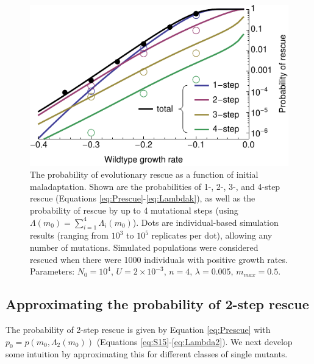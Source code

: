 \documentclass[9pt,twocolumn,twoside,lineno]{gsajnl}
\begin{document}
\begin{figure}[htb]
\centering
\includegraphics[width=\linewidth]{../IMAGES/4stepNormalU_sims.pdf}
\caption{
The probability of evolutionary rescue as a function of initial maladaptation.
Shown are the probabilities of 1-, 2-, 3-, and 4-step rescue (Equations \ref{eq:Prescue}-\ref{eq:Lambdak}), as well as the probability of rescue by up to 4 mutational steps (using $\Lambda(m_0) = \sum_{i=1}^4 \Lambda_i(m_0)$).
Dots are individual-based simulation results (ranging from $10^3$ to $10^5$ replicates per dot), allowing any number of mutations.
Simulated populations were considered rescued when there were 1000 individuals with positive growth rates.
Parameters: $N_0=10^4$, $U=2\times10^{-3}$, $n=4$, $\lambda=0.005$, $m_{max}=0.5$.
}%
\label{fig:1vs2m0}
\end{figure}

\subsection{Approximating the probability of 2-step rescue}

The probability of 2-step rescue is given by Equation \ref{eq:Prescue} with $p_0=p(m_0,\Lambda_2(m_0))$ (Equations \ref{eq:S15}-\ref{eq:Lambda2}).
We next develop some intuition by approximating this for different classes of single mutants.
\end{document}
